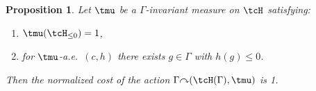 \documentclass[12pt]{article}
\theoremstyle{plain}
\newtheorem{prop}[thm]{Proposition}
\theoremstyle{definition}
\theoremstyle{remark}
\newcommand{\G}{\Gamma}
\newcommand\Meas{{\operatorname{Meas}}}
\def\cc{{\curvearrowright}}
\begin{document}





\begin{prop}\label{P:product-cost}
Let $\tmu$ be a $\G$-invariant measure on $\tcH$ satisfying:
\begin{enumerate}
    \item $\tmu(\tcH_{\le 0})=1$, 
    \item for $\tmu$-a.e.\ $(c,h)$ there exists $g \in \G$ with $h(g)\le 0$.
\end{enumerate}
Then the normalized cost of the action $\G \cc (\tcH(\G),\tmu)$ is 1.
\end{prop}
\end{document}
